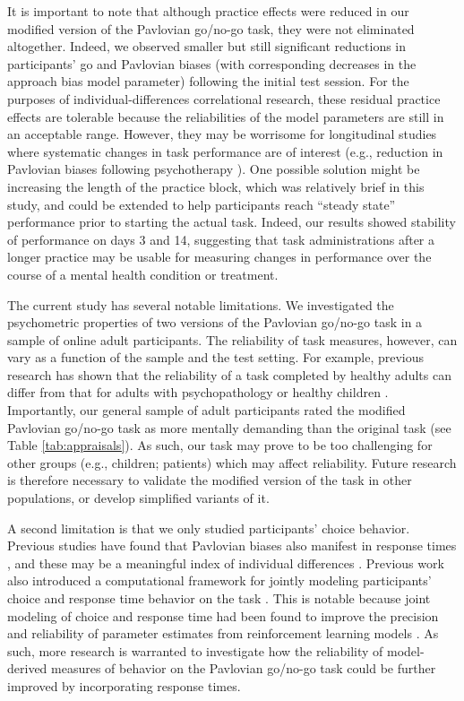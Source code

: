 \documentclass[a4paper,12pt]{article}
\begin{document}
\begin{refsection}[main]
It is important to note that although practice effects were reduced in our modified version of the Pavlovian go/no-go task, they were not eliminated altogether. Indeed, we observed smaller but still significant reductions in participants' go and Pavlovian biases (with corresponding decreases in the approach bias model parameter) following the initial test session. For the purposes of individual-differences correlational research, these residual practice effects are tolerable because the reliabilities of the model parameters are still in an acceptable range. However, they may be worrisome for longitudinal studies where systematic changes in task performance are of interest (e.g., reduction in Pavlovian biases following psychotherapy \cite{geurts2022aversive}). One possible solution might be increasing the length of the practice block, which was relatively brief in this study, and could be extended to help participants reach ``steady state'' performance prior to starting the actual task. Indeed, our results showed stability of performance on days 3 and 14, suggesting that task administrations after a longer practice may be usable for measuring changes in performance over the course of a mental health condition or treatment.

The current study has several notable limitations. We investigated the psychometric properties of two versions of the Pavlovian go/no-go task in a sample of online adult participants. The reliability of task measures, however, can vary as a function of the sample and the test setting. For example, previous research has shown that the reliability of a task completed by healthy adults can differ from that for adults with psychopathology \cite{cooper2017role} or healthy children \cite{arnon2020current}. Importantly, our general sample of adult participants rated the modified Pavlovian go/no-go task as more mentally demanding than the original task (see Table \ref{tab:appraisals}). As such, our task may prove to be too challenging for other groups (e.g., children; patients) which may affect reliability. Future research is therefore necessary to validate the modified version of the task in other populations, or develop simplified variants of it. 

A second limitation is that we only studied participants' choice behavior. Previous studies have found that Pavlovian biases also manifest in response times \cite{millner2018pavlovian, algermissen2022striatal}, and these may be a meaningful index of individual differences \cite{betts2020learning, millner2019suicidal, scholz2020dissociable}. Previous work also introduced a computational framework for jointly modeling participants' choice and response time behavior on the task \cite{millner2018pavlovian, millner2019suicidal}. This is notable because joint modeling of choice and response time had been found to improve the precision and reliability of parameter estimates from reinforcement learning models \cite{ballard2019joint, shahar2019improving}. As such, more research is warranted to investigate how the reliability of model-derived measures of behavior on the Pavlovian go/no-go task could be further improved by incorporating response times. 


\end{refsection}
\end{document}
